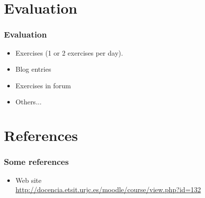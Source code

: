 \documentclass{beamer}
\begin{document}
\section{Evaluation}


\begin{frame}
\frametitle{Evaluation}

\begin{itemize}
\item Exercises (1 or 2 exercises per day).
\item Blog entries
\item Exercises in forum
\item Others...
\end{itemize}

\end{frame}



\section{References}

\begin{frame}
\frametitle{Some references}

\begin{itemize}
\item Web site \\
  \url{http://docencia.etsit.urjc.es/moodle/course/view.php?id=132}

\end{itemize}

\end{frame}
\end{document}
